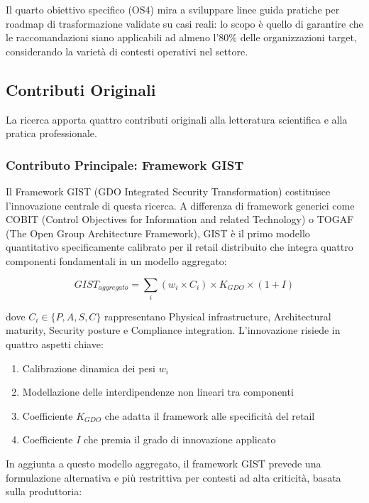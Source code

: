 Il quarto obiettivo specifico (OS4) mira a sviluppare linee guida pratiche per roadmap di trasformazione validate su casi reali: lo scopo è quello di garantire che le raccomandazioni siano applicabili ad almeno l'80\% delle organizzazioni target, considerando la varietà di contesti operativi nel settore.

\subsection{Contributi Originali}

La ricerca apporta quattro contributi originali alla letteratura scientifica e alla pratica professionale.

\subsubsection{Contributo Principale: Framework GIST}

Il Framework GIST (GDO Integrated Security Transformation) costituisce l'innovazione centrale di questa ricerca. A differenza di framework generici come COBIT (Control Objectives for Information and related Technology) o TOGAF (The Open Group Architecture Framework), GIST è il primo modello quantitativo specificamente calibrato per il retail distribuito che integra quattro componenti fondamentali in un modello aggregato:

\begin{equation}
GIST_{aggregato} = \sum_{i}(w_i \times C_i) \times K_{GDO} \times (1+I)
\end{equation}

dove $C_i \in \{P, A, S, C\}$ rappresentano Physical infrastructure, Architectural maturity, Security posture e Compliance integration. L'innovazione risiede in quattro aspetti chiave:
\begin{enumerate}
\item Calibrazione dinamica dei pesi $w_i$
\item Modellazione delle interdipendenze non lineari tra componenti
\item Coefficiente $K_{GDO}$ che adatta il framework alle specificità del retail
\item Coefficiente $I$ che premia il grado di innovazione applicato
\end{enumerate}

In aggiunta a questo modello aggregato, il framework GIST prevede una formulazione alternativa e più restrittiva per contesti ad alta criticità, basata sulla produttoria:

